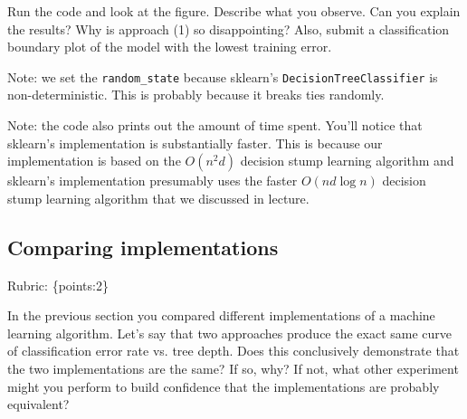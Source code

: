 \documentclass{article}
\def\rubric#1{\gre{Rubric: \{#1\}}}{}
\def\blu#1{{\color{blu}#1}}
\def\gre#1{{\color{gre}#1}}
\begin{document}
	Run the code and look at the figure.
	\blu{Describe what you observe. Can you explain the results?} Why is approach (1) so disappointing? Also, \blu{submit a classification boundary plot of the model with the lowest training error}.

	Note: we set the \verb|random_state| because sklearn's \texttt{DecisionTreeClassifier} is non-deterministic. This is probably
	because it breaks ties randomly.

	Note: the code also prints out the amount of time spent. You'll notice that sklearn's implementation is substantially faster. This is because
	our implementation is based on the $O(n^2d)$ decision stump learning algorithm and sklearn's implementation presumably uses the faster $O(nd\log n)$
	decision stump learning algorithm that we discussed in lecture.


	\subsection{Comparing implementations}
	\rubric{points:2}

	In the previous section you compared different implementations of a machine learning algorithm. Let's say that two
	approaches produce the exact same curve of classification error rate vs. tree depth. Does this conclusively demonstrate
	that the two implementations are the same? If so, why? If not, what other experiment might you perform to build confidence
	that the implementations are probably equivalent?
\end{document}
